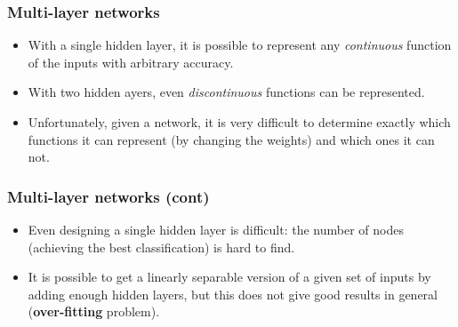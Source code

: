 %
\begin{frame}
\frametitle{Multi-layer networks}

\begin{itemize}

  \item With a single hidden layer, it is possible to represent any
  \emph{continuous} function of the inputs with arbitrary accuracy.

  \item With two hidden ayers, even \emph{discontinuous} functions
  can be represented.

  \item Unfortunately, given a network, it is very difficult to
  determine exactly which functions it can represent (by changing the
  weights) and which ones it can not.

\end{itemize}

\end{frame}


%
\begin{frame}
\frametitle{Multi-layer networks (cont)}

\begin{itemize}

  \item Even designing a single hidden layer is difficult: the number
  of nodes (achieving the best classification) is hard to find.

  \item It is possible to get a linearly separable version of a given
  set of inputs by adding enough hidden layers, but this does not give
  good results in general (\textbf{over-fitting} problem).

\end{itemize}
 
\end{frame}

